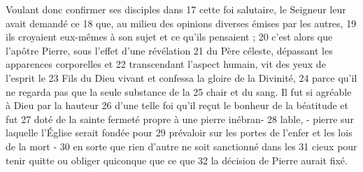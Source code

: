 Voulant donc confirmer ses disciples dans	 
17	 	cette foi salutaire, le Seigneur leur avait demandé ce	 
18	 	que, au milieu des opinions diverses émises par les autres,	 
19	 	ils croyaient eux-mêmes à son sujet et ce qu'ils pensaient ;	 
20	 	c'est alors que l'apôtre Pierre, sous l'effet d'une révélation	 
21	 	du Père céleste, dépassant les apparences corporelles et	 
22	 	transcendant l'aspect humain, vit des yeux de l'esprit le	 
23	 	Fils du Dieu vivant et confessa la gloire de la Divinité,	 
24	 	parce qu'il ne regarda pas que la seule substance de la	 
25	 	chair et du sang. Il fut si agréable à Dieu par la hauteur	 
26	 	d'une telle foi qu'il reçut le bonheur de la béatitude et fut	 
27	 	doté de la sainte fermeté propre à une pierre inébran-	 
28	 	lable, - pierre sur laquelle l'Église serait fondée pour	 
29	 	prévaloir sur les portes de l'enfer et les lois de la mort -	 
30	 	en sorte que rien d'autre ne soit sanctionné dans les	 
31	 	cieux pour tenir quitte ou obliger quiconque que ce que	 
32	 	la décision de Pierre aurait fixé.